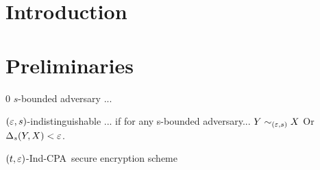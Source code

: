\documentclass{article}
\newcommand{\tcpa}{$(t,\eps)$-Ind-CPA}
\def\vaa{0}
\begin{document}
\title{}
\author{}

\maketitle

\def \cF {\F}

\begin{abstract}
\end{abstract}

\section{Introduction}
\section{Preliminaries}

\vaa
$s$-bounded adversary ...
\begin{definition}
$(\varepsilon,s)$-indistinguishable ...  if for any s-bounded adversary...
$Y \sim_{(\varepsilon,s)} X$ Or $\Delta_{s}(Y,X)<\varepsilon$.
\end{definition}

\begin{definition} 
\tcpa~secure encryption scheme
\end{definition}
\end{document}
